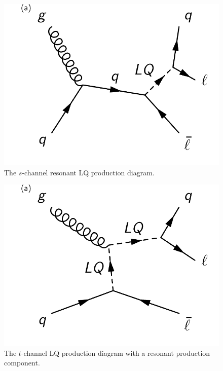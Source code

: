 \begin{figure}[!Hh]
       \centering
       \includegraphics[scale=0.65]{Figures/schannel.pdf} 
       \caption[The $s$-channel resonant LQ production diagram.]{The $s$-channel resonant LQ production diagram.}
\label{figapp:schanneldiag}
\end{figure}


\begin{figure}[!Hh]
       \centering
       \includegraphics[scale=0.65]{Figures/tchannel1.pdf} 
       \caption[The $t$-channel LQ production diagram with a resonant production component.]{The $t$-channel LQ production diagram with a resonant production component.}
\label{figapp:tchannel1diag}
\end{figure}


